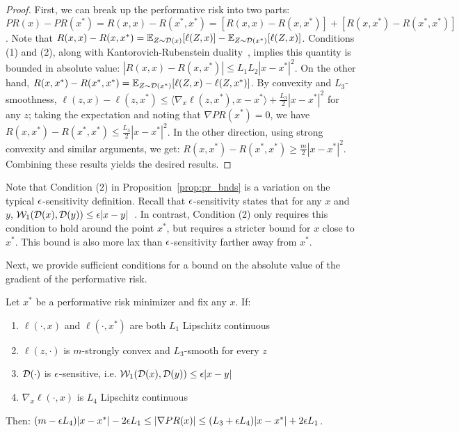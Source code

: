 \begin{proof}
First, we can break up the performative risk into two parts: $PR(x) - PR(x^*) = R(x,x) - R(x^*,x^*) = [R(x,x) - R(x,x^*)] + [R(x,x^*) - R(x^*,x^*)]$. 
Note that $R(x,x) - R(x,x^*) = \mathbb{E}_{Z \sim \mathcal{D}(x)} [\ell(Z,x)] - \mathbb{E}_{Z \sim \mathcal{D}(x^*)} [\ell(Z,x)]$. Conditions (1) and (2), along with Kantorovich-Rubenstein duality~\citep{Villani:2003th}, implies this quantity is bounded in absolute value: $|R(x,x) - R(x,x^*)| \le L_1 L_2 |x-x^*|^2$. 
On the other hand, $R(x,x^*) - R(x^*,x^*) = \mathbb{E}_{Z \sim \mathcal{D}(x^*)} [\ell(Z,x) - \ell(Z,x^*)]$. By convexity and $L_3$-smoothness, $\ell(z,x) - \ell(z,x^*) \le \langle \nabla_x \ell(z,x^*), x-x^* \rangle + \frac{L_3}{2} |x-x^*|^2$ for any $z$; taking the expectation and noting that $\nabla PR(x^*) = 0$, we have $R(x,x^*) - R(x^*,x^*) \le \frac{L_3}{2} |x-x^*|^2$. In the other direction, using strong convexity and similar arguments, we get: $R(x,x^*) - R(x^*,x^*) \ge \frac{m}{2} |x-x^*|^2$. Combining these results yields the desired results.
\end{proof}
Note that Condition (2) in Proposition~\ref{prop:pr_bnds} is a variation on the typical $\epsilon$-sensitivity definition. Recall that $\epsilon$-sensitivity states that for any $x$ and $y$, $\mathcal{W}_1(\mathcal{D}(x),\mathcal{D}(y)) \le \epsilon|x-y|$~\citep{Perdomo:2020tz}. In contrast, Condition (2) only requires this condition to hold around the point $x^*$, but requires a stricter bound for $x$ close to $x^*$. This bound is also more lax than $\epsilon$-sensitivity farther away from $x^*$.

Next, we provide sufficient conditions for a bound on the absolute value of the gradient of the performative risk. 

\begin{proposition}
\label{prop:grad_bounds}
Let $x^*$ be a performative risk minimizer and fix any $x$. If:
\begin{enumerate}
    \item $\ell(\cdot,x)$ and $\ell(\cdot, x^*)$ are both $L_1$ Lipschitz continuous
    \item $\ell(z,\cdot)$ is $m$-strongly convex and $L_3$-smooth for every $z$
    \item $\mathcal{D}(\cdot)$ is $\epsilon$-sensitive, i.e. $\mathcal{W}_1(\mathcal{D}(x),\mathcal{D}(y)) \le \epsilon |x-y|$
    \item $\nabla_x \ell(\cdot,x)$ is $L_4$ Lipschitz continuous
\end{enumerate}
Then: $(m- \epsilon L_4)|x-x^*| - 2 \epsilon L_1 \le |\nabla PR(x)| \le (L_3 + \epsilon L_4) |x-x^*| + 2 \epsilon L_1$.
\end{proposition}

